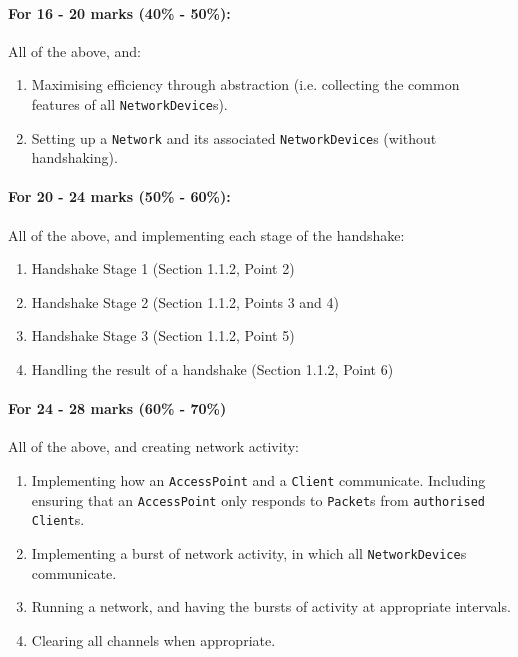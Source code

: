 \documentclass[11pt]{article}
\begin{document}
\paragraph{For 16 - 20 marks (40\% - 50\%):}

			All of the above, and:  \begin{enumerate}
			
				\item Maximising efficiency through abstraction (i.e. collecting the common features of all \texttt{NetworkDevice}s).
				
				\item Setting up a \texttt{Network} and its associated \texttt{NetworkDevice}s (without handshaking).

			\end{enumerate}

\paragraph{For 20 - 24 marks (50\% - 60\%):}

			All of the above, and implementing each stage of the handshake:  \begin{enumerate}
			
				\item Handshake Stage 1 (Section 1.1.2, Point 2)
				
				\item Handshake Stage 2 (Section 1.1.2, Points 3 and 4)
				
				\item Handshake Stage 3 (Section 1.1.2, Point 5)
				
				\item Handling the result of  a handshake (Section 1.1.2, Point 6)
				
			\end{enumerate}

\paragraph{For 24 - 28 marks (60\% - 70\%)}
			
			All of the above, and creating network activity:  \begin{enumerate}
			
				\item Implementing how an \texttt{AccessPoint} and a \texttt{Client} communicate. Including ensuring that an \texttt{AccessPoint} only responds to \texttt{Packet}s from \texttt{authorised} \texttt{Client}s.
				
				\item Implementing a burst of network activity, in which all \texttt{NetworkDevice}s communicate.
				
				\item Running a network, and having the bursts of activity at appropriate intervals.
				
				\item Clearing all channels when appropriate.
				
			\end{enumerate}
\end{document}
